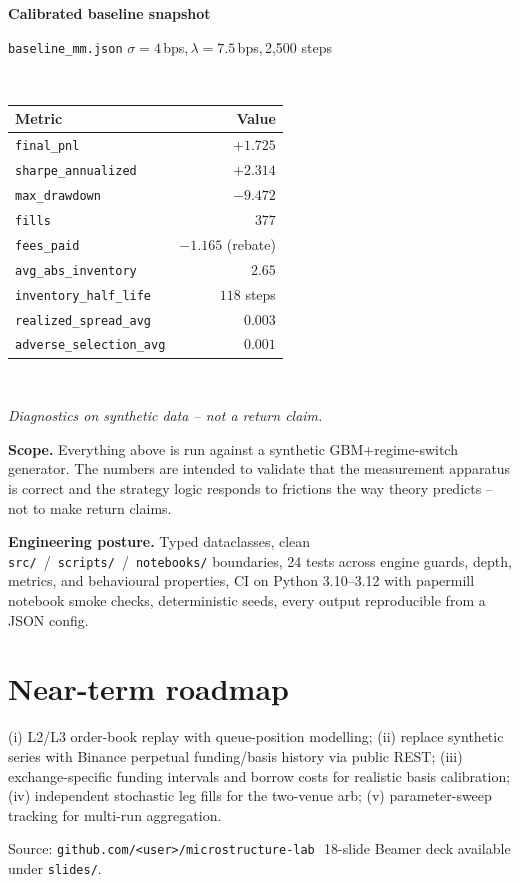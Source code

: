 \documentclass[10pt, a4paper]{article}
\newcommand{\code}[1]{\texttt{\small #1}}
\begin{document}
\vspace{-4pt}
\noindent\begin{minipage}[t]{0.46\linewidth}
\centering
\textbf{Calibrated baseline snapshot}\\[2pt]
\parbox{0.78\linewidth}{\centering\footnotesize
\code{baseline\_mm.json}\,\textbullet\,$\sigma{=}4$\,bps,\,$\lambda{=}7.5$\,bps,\,2{,}500 steps}\\[4pt]
\small
\begin{tabular}{@{}lr@{}}
\toprule
\textbf{Metric} & \textbf{Value} \\
\midrule
\code{final\_pnl}              & $+1.725$ \\
\code{sharpe\_annualized}      & $+2.314$ \\
\code{max\_drawdown}           & $-9.472$ \\
\code{fills}                   & $377$ \\
\code{fees\_paid}              & $-1.165$ (rebate) \\
\code{avg\_abs\_inventory}     & $2.65$ \\
\code{inventory\_half\_life}   & $118$ steps \\
\code{realized\_spread\_avg}   & $0.003$ \\
\code{adverse\_selection\_avg} & $0.001$ \\
\bottomrule
\end{tabular}\\[3pt]
\parbox{0.85\linewidth}{\centering\footnotesize\color{mgray}\textit{Diagnostics on synthetic data -- not a return claim.}}
\end{minipage}\hfill
\begin{minipage}[t]{0.50\linewidth}
\textbf{Scope.} Everything above is run against a synthetic GBM+regime-switch generator. The numbers are intended to validate that the measurement apparatus is correct and the strategy logic responds to frictions the way theory predicts -- not to make return claims.

\vspace{4pt}
\textbf{Engineering posture.} Typed dataclasses, clean \code{src/}~/~\code{scripts/}~/~\code{notebooks/} boundaries, 24 tests across engine guards, depth, metrics, and behavioural properties, CI on Python 3.10--3.12 with papermill notebook smoke checks, deterministic seeds, every output reproducible from a JSON config.
\end{minipage}

\section{Near-term roadmap}

(i) L2/L3 order-book replay with queue-position modelling; (ii) replace synthetic series with Binance perpetual funding/basis history via public REST; (iii) exchange-specific funding intervals and borrow costs for realistic basis calibration; (iv) independent stochastic leg fills for the two-venue arb; (v) parameter-sweep tracking for multi-run aggregation.

\vspace{2pt}
\footnotesize\color{mgray}\hfill
Source: \texttt{github.com/\textless{}user\textgreater/microstructure-lab}\,\textbullet\, 18-slide Beamer deck available under \texttt{slides/}.
\end{document}
